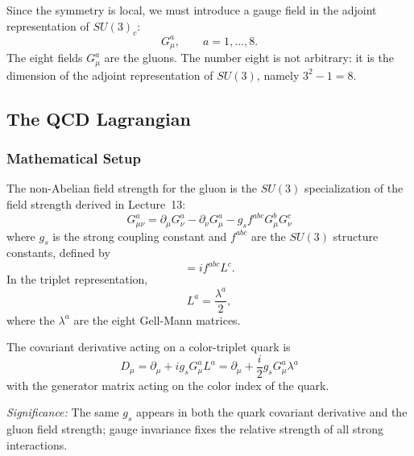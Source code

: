 \documentclass[../main.tex]{subfiles}
\begin{document}
Since the symmetry is local, we must introduce a gauge field in the adjoint representation of $SU(3)_c$:
\begin{equation}
  G_\mu^a,\qquad a=1,\ldots,8 .
  \label{eq:lec14:gluon_field}
\end{equation}
The eight fields $G_\mu^a$ are the gluons. The number eight is not arbitrary: it is the dimension of the adjoint representation of $SU(3)$, namely $3^2-1=8$.

\subsection{The QCD Lagrangian}\label{sec:lec14:qcd-lagrangian}

\subsubsection*{Mathematical Setup}

The non-Abelian field strength for the gluon is the $SU(3)$ specialization of the field strength derived in Lecture~13:
\begin{equation}
  \boxed{\;G_{\mu\nu}^a
  = \partial_\mu G_\nu^a-\partial_\nu G_\mu^a
  -g_s f^{abc}G_\mu^bG_\nu^c\;}
  \label{eq:lec14:gluon_field_strength}
\end{equation}
where $g_s$ is the strong coupling constant and $f^{abc}$ are the $SU(3)$ structure constants, defined by
\begin{equation}
  [L^a,L^b]=i f^{abc}L^c .
  \label{eq:lec14:su3_algebra}
\end{equation}
In the triplet representation,
\begin{equation}
  L^a=\frac{\lambda^a}{2},
  \label{eq:lec14:gellmann_generators}
\end{equation}
where the $\lambda^a$ are the eight Gell-Mann matrices.

The covariant derivative acting on a color-triplet quark is
\begin{equation}
  \boxed{\;D_\mu = \partial_\mu + i g_s G_\mu^a L^a
  = \partial_\mu+\frac{i}{2}g_sG_\mu^a\lambda^a\;}
  \label{eq:lec14:qcd_covariant_derivative}
\end{equation}
with the generator matrix acting on the color index of the quark.

\textit{Significance:} The same $g_s$ appears in both the quark covariant derivative and the gluon field strength; gauge invariance fixes the relative strength of all strong interactions.
\end{document}
